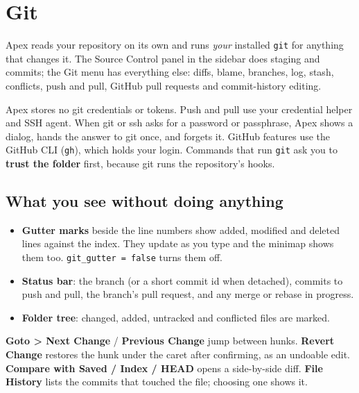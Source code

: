 \documentclass[11pt,a4paper,oneside]{report}
\newcommand{\menu}[1]{\textbf{#1}}
\newcommand{\setting}[1]{\texttt{#1}}
\begin{document}
\chapter{Git}
\label{ch:git}

\begin{nutshell}
Apex reads your repository on its own and runs \emph{your} installed
\texttt{git} for anything that changes it. The Source Control panel in the
sidebar does staging and commits; the Git menu has everything else:
diffs, blame, branches, log, stash, conflicts, push and pull, GitHub pull
requests and commit-history editing.
\end{nutshell}

\begin{safenote}
Apex stores no git credentials or tokens. Push and pull use your credential
helper and SSH agent. When git or ssh asks for a password or passphrase,
Apex shows a dialog, hands the answer to git once, and forgets it. GitHub
features use the GitHub CLI (\texttt{gh}), which holds your login. Commands
that run \texttt{git} ask you to \textbf{trust the folder} first, because
git runs the repository's hooks.
\end{safenote}

\section{What you see without doing anything}

\begin{itemize}
\item \textbf{Gutter marks} beside the line numbers show added, modified and
  deleted lines against the index. They update as you type and the minimap
  shows them too. \setting{git\_gutter = false} turns them off.
\item \textbf{Status bar}: the branch (or a short commit id when detached),
  commits to push and pull, the branch's pull request, and any merge or
  rebase in progress.
\item \textbf{Folder tree}: changed, added, untracked and conflicted files
  are marked.
\end{itemize}

\menu{Goto > Next Change} / \menu{Previous Change} jump between hunks.
\menu{Revert Change} restores the hunk under the caret after confirming, as
an undoable edit. \menu{Compare with Saved / Index / HEAD} opens a
side-by-side diff. \menu{File History} lists the commits that touched the
file; choosing one shows it.
\end{document}
